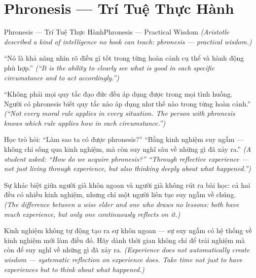 \section{Phronesis — Trí Tuệ Thực Hành}
\begin{truyen}{Phronesis — Trí Tuệ Thực Hành}{Phronesis — Practical Wisdom}
\textit{(Aristotle described a kind of intelligence no book can teach: phronesis — practical wisdom.)}

``Nó là khả năng nhìn rõ điều gì tốt trong từng hoàn cảnh cụ thể và hành động phù hợp.''
\textit{(``It is the ability to clearly see what is good in each specific circumstance and to act accordingly.'')}

``Không phải mọi quy tắc đạo đức đều áp dụng được trong mọi tình huống. Người có phronesis biết quy tắc nào áp dụng như thế nào trong từng hoàn cảnh.''
\textit{(``Not every moral rule applies in every situation. The person with phronesis knows which rule applies how in each circumstance.'')}

Học trò hỏi: ``Làm sao ta có được phronesis?'' ``Bằng kinh nghiệm suy ngẫm — không chỉ sống qua kinh nghiệm, mà còn suy nghĩ sâu về những gì đã xảy ra.''
\textit{(A student asked: ``How do we acquire phronesis?'' ``Through reflective experience — not just living through experience, but also thinking deeply about what happened.'')}

Sự khác biệt giữa người già khôn ngoan và người già không rút ra bài học: cả hai đều có nhiều kinh nghiệm, nhưng chỉ một người liên tục suy ngẫm về chúng.
\textit{(The difference between a wise elder and one who draws no lessons: both have much experience, but only one continuously reflects on it.)}

\end{truyen}

\begin{baihoc}
Kinh nghiệm không tự động tạo ra sự khôn ngoan — sự suy ngẫm có hệ thống về kinh nghiệm mới làm điều đó. Hãy dành thời gian không chỉ để trải nghiệm mà còn để suy nghĩ về những gì đã xảy ra.
\textit{(Experience does not automatically create wisdom — systematic reflection on experience does. Take time not just to have experiences but to think about what happened.)}
\end{baihoc}
\ngancach

